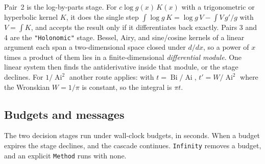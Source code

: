 Pair~2 is the log-by-parts stage. For
\(c\log g(x)\,K(x)\) with a trigonometric or hyperbolic kernel \(K\), it does the
single step \(\int\log g\,K=\log g\,V-\int V\,g'/g\) with \(V=\int K\), and accepts
the result only if it differentiates back exactly. Pairs 3 and 4 are the
\texttt{"Holonomic"} stage. Bessel, Airy, and sine/cosine
kernels of a linear argument each span a two-dimensional space closed under
\(d/dx\), so a power of \(x\) times a product of them lies in a finite-dimensional
\emph{differential module}. One linear system then finds the antiderivative inside
that module, or the stage declines. For \(1/\operatorname{Ai}^2\) another route
applies: with \(t=\operatorname{Bi}/\operatorname{Ai}\), \(t'=W/\operatorname{Ai}^2\)
where the Wronskian \(W=1/\pi\) is constant, so the integral is \(\pi t\).

\subsection{Budgets and messages}
\label{ssec:int-messages}

The two decision stages run under wall-clock budgets, in seconds. When a budget
expires the stage declines, and the cascade continues. \texttt{Infinity} removes a
budget, and an explicit \texttt{Method} runs with none.

\begin{codepairs}
\end{codepairs}

